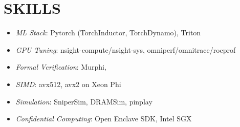 \section{SKILLS}
    \vspace{-7pt}
    \resumeItemListStart
            \begin{itemize}
            \item[] \textit{ML Stack}: Pytorch (TorchInductor, TorchDynamo), Triton
            \item[] \textit{GPU Tuning}: nsight-compute/nsight-sys, omniperf/omnitrace/rocprof
            \item[] \textit{Formal Verification}: Murphi, 
            \item[] \textit{SIMD}: avx512, avx2 on Xeon Phi
            \item[] \textit{Simulation}: SniperSim, DRAMSim, pinplay
            \item[] \textit{Confidential Computing}: Open Enclave SDK, Intel SGX
            \end{itemize}

    \resumeItemListEnd